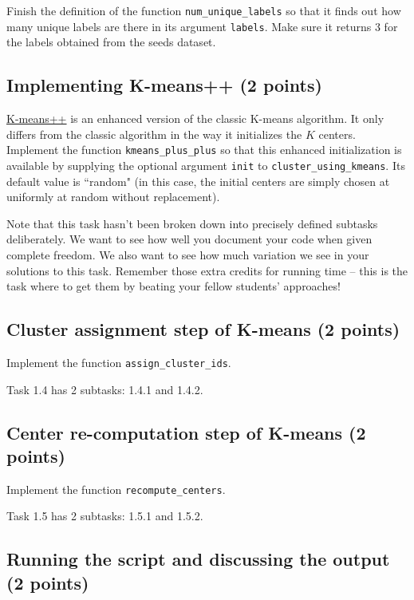 \documentclass{article}
\begin{document}
Finish the definition of the function {\tt num\_unique\_labels} so that it finds out how many unique labels are there in its argument {\tt labels}. Make sure it returns 3 for the labels obtained
from the seeds dataset.

\subsection{Implementing K-means++ (2 points)}

\href{http://en.wikipedia.org/wiki/K-means\%2B\%2B}{K-means++} is an enhanced version of the classic K-means algorithm. It only differs from the classic algorithm in the way it initializes the $K$ centers.
Implement the function {\tt kmeans\_plus\_plus} so that this enhanced initialization is available by supplying the optional argument {\tt init} to {\tt cluster\_using\_kmeans}. Its default value is ``random" (in this case,
the initial centers are simply chosen at uniformly at random without replacement).

Note that this task hasn't been broken down into precisely defined subtasks deliberately. We want to see how well you document your code when given complete freedom. We also want to see how much
variation we see in your solutions to this task. Remember those extra credits for running time -- this is the task where to get them by beating your fellow students' approaches!

\subsection{Cluster assignment step of K-means (2 points)}

Implement the function {\tt assign\_cluster\_ids}.

Task 1.4 has 2 subtasks: 1.4.1 and 1.4.2.

\subsection{Center re-computation step of K-means (2 points)}

Implement the function {\tt recompute\_centers}.

Task 1.5 has 2 subtasks: 1.5.1 and 1.5.2.

\subsection{Running the script and discussing the output (2 points)}
\end{document}
